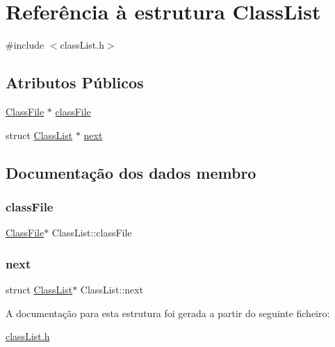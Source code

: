 \hypertarget{struct_class_list}{}\section{Referência à estrutura Class\+List}
\label{struct_class_list}


{\ttfamily \#include $<$class\+List.\+h$>$}

\subsection*{Atributos Públicos}
\begin{DoxyCompactItemize}
\item 
\hyperlink{struct_class_file}{Class\+File} $\ast$ \hyperlink{struct_class_list_a1ccb3a71490dce0f2aea6693e86c7fad}{class\+File}
\item 
struct \hyperlink{struct_class_list}{Class\+List} $\ast$ \hyperlink{struct_class_list_a6ed1f48d7a5ebd33625b0152b739e894}{next}
\end{DoxyCompactItemize}


\subsection{Documentação dos dados membro}
\hypertarget{struct_class_list_a1ccb3a71490dce0f2aea6693e86c7fad}{}\label{struct_class_list_a1ccb3a71490dce0f2aea6693e86c7fad} 
\subsubsection{\texorpdfstring{class\+File}{classFile}}
{\footnotesize\ttfamily \hyperlink{struct_class_file}{Class\+File}$\ast$ Class\+List\+::class\+File}

\hypertarget{struct_class_list_a6ed1f48d7a5ebd33625b0152b739e894}{}\label{struct_class_list_a6ed1f48d7a5ebd33625b0152b739e894} 
\subsubsection{\texorpdfstring{next}{next}}
{\footnotesize\ttfamily struct \hyperlink{struct_class_list}{Class\+List}$\ast$ Class\+List\+::next}



A documentação para esta estrutura foi gerada a partir do seguinte ficheiro\+:\begin{DoxyCompactItemize}
\item 
\hyperlink{class_list_8h}{class\+List.\+h}\end{DoxyCompactItemize}
